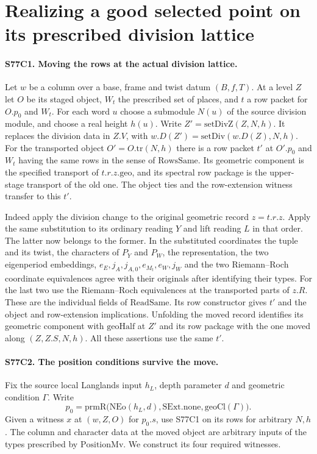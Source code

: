 \section{Realizing a good selected point on its prescribed division lattice}

\paragraph{S77C1. Moving the rows at the actual division lattice.}
Let $w$ be a column over a base, frame and twist datum $(B,f,T)$.
At a level $Z$ let $O$ be its staged object, $W_t$ the prescribed
set of places, and $t$ a row packet for $O.p_0$ and $W_t$. For each
word $u$ choose a submodule $N(u)$ of the source division module,
and choose a real height $h(u)$. Write $Z'=\mathrm{setDivZ}(Z,N,h)$.
It replaces the division data in $Z.V$, with
$w.D(Z')=\mathrm{setDiv}(w.D(Z),N,h)$. For the transported object
$O'=O.\mathrm{tr}(N,h)$ there is a row packet $t'$ at $O'.p_0$
and $W_t$ having the same rows in the sense of $\mathrm{RowsSame}$.
Its geometric component is the specified transport of $t.r.z.\mathrm{geo}$,
and its spectral row package is the upper-stage transport of the old
one. The object ties and the row-extension witness transfer to this $t'$.

Indeed apply the division change to the original geometric record
$z=t.r.z$. Apply the same substitution to its ordinary reading $Y$
and lift reading $L$ in that order. The latter now belongs to the
former. In the substituted coordinates the tuple and its twist,
the characters of $P_Y$ and $P_W$, the representation, the two eigenperiod
embeddings, $e_E,j_A,j_{A,0},e_{M_t},e_W,j_W$ and the two
Riemann--Roch coordinate equivalences agree with their originals
after identifying their types. For the last two use the
Riemann--Roch equivalences at the transported parts of $z.R$.
These are the individual fields of $\mathrm{ReadSame}$. Its row
constructor gives $t'$ and the object and row-extension implications.
Unfolding the moved record identifies its geometric component with
$\mathrm{geoHalf}$ at $Z'$ and its row package with the one moved
along $(Z,Z.S,N,h)$. All these assertions use the same $t'$.

\paragraph{S77C2. The position conditions survive the move.}
Fix the source local Langlands input $h_L$, depth parameter $d$
and geometric condition $\Gamma$. Write
\[
 p_0=\mathrm{prmR}\bigl(\mathrm{NEo}(h_L,d),
       \mathrm{SExt.none},\mathrm{geoCl}(\Gamma)\bigr).
\]
Given a witness $x$ at $(w,Z,O)$ for $p_0.s$, use S77C1 on its
rows for arbitrary $N,h$. The column and character data at the
moved object are arbitrary inputs of the types prescribed by
$\mathrm{PositionMv}$. We construct its four required witnesses.

